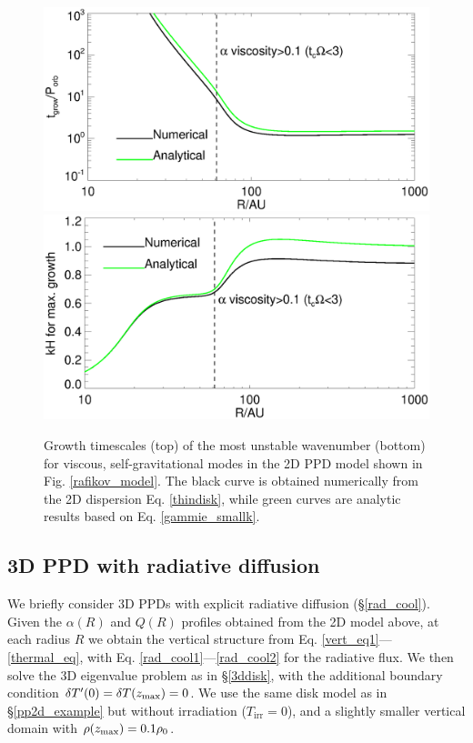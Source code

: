\begin{figure}
  \includegraphics[width=\linewidth,clip=true,trim=0cm 1.5cm 0cm
    0.0cm]{figures/ppd_2d_growth}\\
  \includegraphics[width=\linewidth,clip=true,trim=0cm 0cm 0cm
    0.8cm]{figures/ppd_2d_maxk}
  \caption{Growth timescales (top) of the most unstable
    wavenumber (bottom) for viscous,
    self-gravitational modes in the 2D PPD model shown in
    Fig. \ref{rafikov_model}. 
    The black curve is obtained numerically
    from the 2D dispersion Eq. \ref{thindisk}, while green curves 
    are analytic results based on Eq. \ref{gammie_smallk}. 
    \label{rafikov_growth}}
\end{figure}


\subsection{3D PPD with radiative diffusion}
We briefly consider 3D PPDs with explicit radiative diffusion
(\S\ref{rad_cool}). 
Given the $\alpha(R)$ and $Q(R)$ profiles obtained
from the 2D model above, at each radius $R$ we obtain the vertical
structure from Eq. \ref{vert_eq1}---\ref{thermal_eq}, with 
Eq. \ref{rad_cool1}---\ref{rad_cool2} for the radiative flux.
We then solve the 3D eigenvalue problem as in \S\ref{3ddisk}, with the
additional boundary condition $\delta T^\prime(0) = \delta T(z_\mathrm{max}) = 0$.    
We use the same disk model as in \S\ref{pp2d_example} but without 
irradiation ($T_\mathrm{irr}=0$), and a slightly smaller vertical
domain with $\rho(z_\mathrm{max})=0.1\rho_0$.  %

